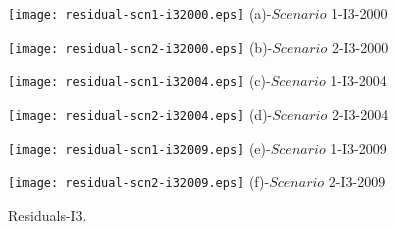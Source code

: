 \documentclass[Journal]{ascelike}
\begin{document}
\begin{figure}
 \begin{minipage}[h]{0.5\linewidth}
        \centering
        \texttt{[image: residual-scn1-i32000.eps]}
				\footnotesize{(a)-$Scenario$ 1-I3-2000}
     \end{minipage}
\vspace{3.00mm}
    \begin{minipage}[h]{0.5\linewidth}
       \centering
       \texttt{[image: residual-scn2-i32000.eps]}
			\footnotesize{(b)-$Scenario$ 2-I3-2000}
     \end{minipage}
\vspace{3.00mm} 
    \begin{minipage}[h]{0.5\linewidth}
        \centering
        \texttt{[image: residual-scn1-i32004.eps]}
				\footnotesize{(c)-$Scenario$ 1-I3-2004}
     \end{minipage}
\vspace{3.00mm}
    \begin{minipage}[h]{0.5\linewidth}
       \centering
       \texttt{[image: residual-scn2-i32004.eps]}
			\footnotesize{(d)-$Scenario$ 2-I3-2004}
     \end{minipage}
\vspace{3.00mm}
    \begin{minipage}[h]{0.5\linewidth}
       \centering
       \texttt{[image: residual-scn1-i32009.eps]}
			\footnotesize{(e)-$Scenario$ 1-I3-2009}
     \end{minipage}
\vspace{3.00mm}
    \begin{minipage}[h]{0.5\linewidth}
       \centering
       \texttt{[image: residual-scn2-i32009.eps]}
			\footnotesize{(f)-$Scenario$ 2-I3-2009}
     \end{minipage}
		\caption{Residuals-I3.}
\label{fig7}
\end{figure}
\end{document}
